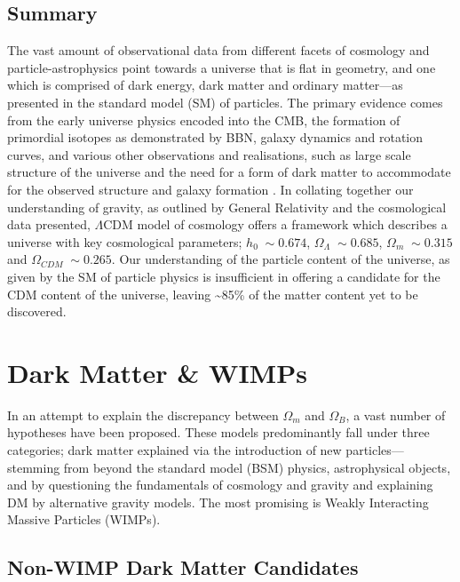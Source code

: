 \subsection{Summary}
\label{subsec:evidence_summary}

The vast amount of observational data from different facets of cosmology and particle-astrophysics point towards a universe that is flat in geometry, and one which is comprised of dark energy, dark matter and ordinary matter---as presented in the standard model (SM) of particles. The primary evidence comes from the early universe physics encoded into the CMB, the formation of primordial isotopes as demonstrated by BBN, galaxy dynamics and rotation curves, and various other observations and realisations, such as large scale structure of the universe and the need for a form of dark matter to accommodate for the observed structure and galaxy formation \cite{LSS_coles}. In collating together our understanding of gravity, as outlined by General Relativity and the cosmological data presented, $\Lambda$CDM model of cosmology offers a framework which describes a universe with key cosmological parameters; $h_0 \; \sim0.674$, $\Omega_{\Lambda} \; \sim0.685$, $\Omega_{m} \; \sim0.315$  and $\Omega_{CDM} \; \sim0.265$. Our understanding of the particle content of the universe, as given by the SM of particle physics is insufficient in offering a candidate for the CDM content of the universe, leaving \sim 85\% of the matter content yet to be discovered.


\section{Dark Matter \& WIMPs}
\label{sec:candidates}

In an attempt to explain the discrepancy between $\Omega_{m}$ and $\Omega_{B}$, a vast number of hypotheses have been proposed. These models predominantly fall under three categories; dark matter explained via the introduction of new particles---stemming from beyond the standard model (BSM) physics, astrophysical objects, and by questioning the fundamentals of cosmology and gravity and explaining DM by alternative gravity models. The most promising is Weakly Interacting Massive Particles (WIMPs). 

\subsection{Non-WIMP Dark Matter Candidates}
\label{subsec:non_wimp_dm}

